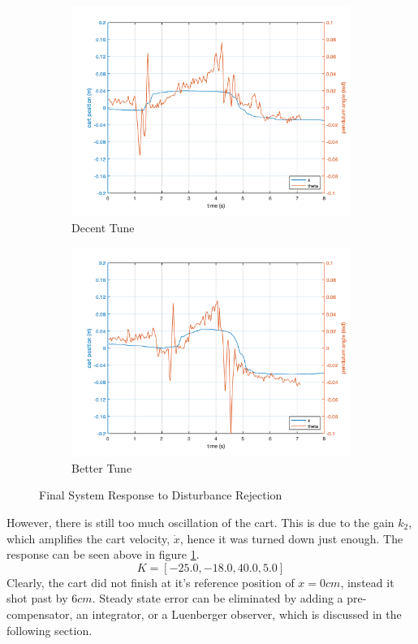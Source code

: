 \documentclass[12pt]{article}
\begin{document}
\begin{figure}[H]
    \centering
    \begin{subfigure}{.49\textwidth}
      \centering
      \includegraphics[width=1\linewidth]{figures/decent.png}
      \caption{Decent Tune}
    \end{subfigure}
    \begin{subfigure}{.49\textwidth}
      \centering
      \includegraphics[width=1\linewidth]{figures/best.png}
      \caption{Better Tune}
      \label{fig:best}
    \end{subfigure}
    \caption{Final System Response to Disturbance Rejection}
    \label{fig:finals}
\end{figure}
However, there is still too much oscillation of the cart. This is due to the gain $k_2$, which amplifies the cart velocity, $\dot{x}$, hence it was turned down just enough. The response can be seen above in figure \ref{fig:best}.
\begin{equation}
    K = [-25.0,-18.0,40.0,5.0]
\end{equation}
Clearly, the cart did not finish at it's reference position of $x=0cm$, instead it shot past by $6cm$. Steady state error can be eliminated by adding a pre-compensator, an integrator, or a Luenberger observer, which is discussed in the following section.
\end{document}
